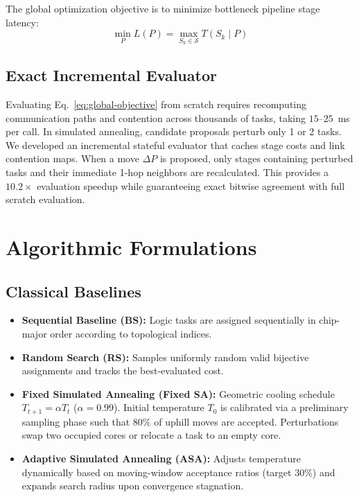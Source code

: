 \documentclass[10pt,conference]{IEEEtran}
\begin{document}
The global optimization objective is to minimize bottleneck pipeline stage latency:
\begin{equation}
  \min_{P} L(P) = \max_{S_k \in \mathcal{S}} T(S_k \mid P)
  \label{eq:global-objective}
\end{equation}

\subsection{Exact Incremental Evaluator}
Evaluating Eq.~\ref{eq:global-objective} from scratch requires recomputing communication paths and contention across thousands of tasks, taking $15$--$25$~ms per call. In simulated annealing, candidate proposals perturb only 1 or 2 tasks. We developed an incremental stateful evaluator that caches stage costs and link contention maps. When a move $\Delta P$ is proposed, only stages containing perturbed tasks and their immediate 1-hop neighbors are recalculated. This provides a $\mathbf{10.2\times}$ evaluation speedup while guaranteeing exact bitwise agreement with full scratch evaluation.

\section{Algorithmic Formulations}
\label{sec:algos}

\subsection{Classical Baselines}
\begin{itemize}
  \item \textbf{Sequential Baseline (BS):} Logic tasks are assigned sequentially in chip-major order according to topological indices.
  \item \textbf{Random Search (RS):} Samples uniformly random valid bijective assignments and tracks the best-evaluated cost.
  \item \textbf{Fixed Simulated Annealing (Fixed SA):} Geometric cooling schedule $T_{t+1} = \alpha T_t$ ($\alpha = 0.99$). Initial temperature $T_0$ is calibrated via a preliminary sampling phase such that $80\%$ of uphill moves are accepted. Perturbations swap two occupied cores or relocate a task to an empty core.
  \item \textbf{Adaptive Simulated Annealing (ASA):} Adjusts temperature dynamically based on moving-window acceptance ratios (target $30\%$) and expands search radius upon convergence stagnation.
\end{itemize}
\end{document}
